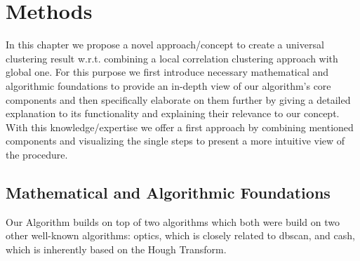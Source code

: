 \chapter{Methods}\label{ch:Methods}
In this chapter we propose a novel approach/concept to create a universal clustering result w.r.t. combining a local correlation clustering approach with global one. For this purpose we first introduce necessary mathematical and algorithmic foundations to provide an in-depth view of our algorithm's core components and then specifically elaborate on them further by giving a detailed explanation to its functionality and explaining their relevance to our concept. With this knowledge/expertise we offer a first approach by combining mentioned components and visualizing the single steps to present a more intuitive view of the procedure. 




\section{Mathematical and Algorithmic Foundations}
\label{sec:Foundations}
Our Algorithm builds on top of two algorithms which both were build on two other well-known algorithms: \gls{optics}, which is closely related to \gls{dbscan}, and \gls{cash}, which is inherently based on the Hough Transform.
